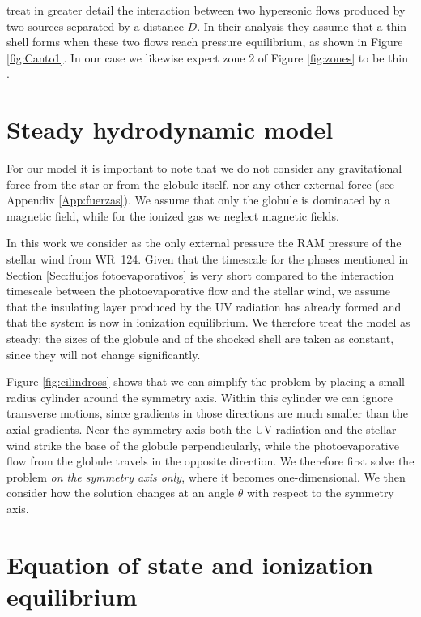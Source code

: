 \documentclass{book}
\begin{document}
\cite{Canto:1996} treat in greater detail the interaction between two
hypersonic flows produced by two sources separated by a distance $D$.
In their analysis they assume that a thin shell forms when these two
flows reach pressure equilibrium, as shown in Figure \ref{fig:Canto1}.
In our case we likewise expect zone 2 of Figure \ref{fig:zones} to be
thin \citep{Wil:2019}.

\section{Steady hydrodynamic model}

For our model it is important to note that we do not consider any
gravitational force from the star or from the globule itself, nor any
other external force (see Appendix \ref{App:fuerzas}). We assume that
only the globule is dominated by a magnetic field, while for the
ionized gas we neglect magnetic fields.

In this work we consider as the only external pressure the RAM
pressure of the stellar wind from WR~124. Given that the timescale for
the phases mentioned in Section \ref{Sec:fluijos fotoevaporativos} is
very short compared to the interaction timescale between the
photoevaporative flow and the stellar wind, we assume that the
insulating layer produced by the UV radiation has already formed and
that the system is now in ionization equilibrium. We therefore treat
the model as steady: the sizes of the globule and of the shocked shell
are taken as constant, since they will not change significantly.

Figure \ref{fig:cilindross} shows that we can simplify the problem by
placing a small-radius cylinder around the symmetry axis. Within this
cylinder we can ignore transverse motions, since gradients in those
directions are much smaller than the axial gradients. Near the symmetry
axis both the UV radiation and the stellar wind strike the base of the
globule perpendicularly, while the photoevaporative flow from the
globule travels in the opposite direction. We therefore first solve
the problem \emph{on the symmetry axis only}, where it becomes
one-dimensional. We then consider how the solution changes at an angle
$\theta$ with respect to the symmetry axis.

\section{Equation of state and ionization equilibrium}
\end{document}
